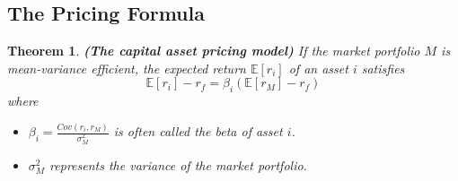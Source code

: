 \documentclass[13pt]{article}
\newtheorem{theorem}{Theorem}[section]
\theoremstyle{definition}
\theoremstyle{remark}
\begin{document}
\subsection{The Pricing Formula}
\begin{theorem}\label{theo:capm}
    \textbf{(The capital asset pricing model)} If the market portfolio $M$ is mean-variance efficient, the expected return $\mathbb{E}[r_i]$ of an asset $i$ satisfies
$$
\mathbb{E}\left[r_{i}\right]-r_{f}=\beta_{i}\left(\mathbb{E}\left[r_{M}\right]-r_{f}\right)
$$
where
\begin{itemize}
    \item $\beta_{i}=\frac{Cov\left(r_{i}, r_{M}\right)}{\sigma_{M}^{2}}$ is often called the beta of asset $i$.
    \item $\sigma_{M}^{2}$ represents the variance of the market portfolio.
\end{itemize}
\end{theorem}
\end{document}
